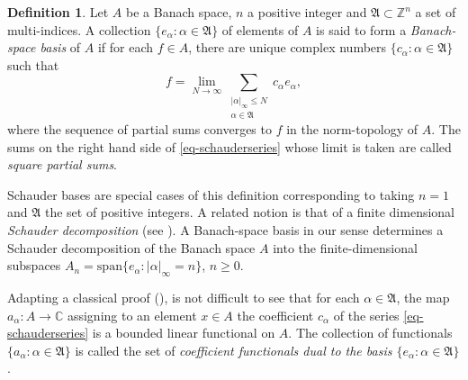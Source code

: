 \documentclass[letterpaper,11pt,reqno]{amsart}
\theoremstyle{plain}
\theoremstyle{definition}
\newtheorem{definition}[equation]{Definition}
\theoremstyle{remark}
\theoremstyle{remark}
\numberwithin{equation}{section}
\newcommand{\abs}[1]{\left\vert#1\right\vert}
\newcommand{\cx}{{\mathbb C}}
\newcommand{\Z}{{\mathbb Z}}
\begin{document}
\begin{definition}\label{def-schauderbasis}
Let $A$ be a Banach space, $n$ a positive integer and $\mathfrak{A} \subset \Z^n$ a set of multi-indices. 
A collection $\{e_\alpha: \alpha\in \mathfrak{A}\}$ of elements of $A$ is said to form a \emph{Banach-space basis} of $A$ if for each $f \in A$, there are unique complex numbers $\{c_\alpha: \alpha\in\mathfrak{A}\}$ such that
\begin{equation}\label{eq-schauderseries}  
f = \lim_{N\to \infty} \sum_{\substack{\abs{\alpha}_\infty\leq N\\\alpha\in \mathfrak{A}}} c_\alpha e_\alpha,  
\end{equation}
where the sequence of partial sums converges to $f$ in the norm-topology of $A$.
The sums on the right hand side of \eqref{eq-schauderseries} whose limit is taken are called  \emph{square partial sums}. 
\end{definition}

Schauder bases  are special cases of this definition corresponding to taking $n=1$ and
$\mathfrak{A}$ the set of positive integers. A related notion is that of a finite dimensional \emph{Schauder decomposition} (see \cite{lt}). A Banach-space basis in our sense determines a Schauder decomposition of the Banach space $A$
into the finite-dimensional subspaces $A_n = \mathrm{span}\{e_\alpha: \abs{\alpha}_\infty=n\}$, $n\geq 0$.

Adapting a classical proof (\cite[Proposition~1.a.2]{lt}), is not difficult to see that for each $\alpha\in \mathfrak{A}$, the map $a_\alpha:A\to \cx$ assigning to an element $x\in A$ the coefficient $c_\alpha$ of the series \eqref{eq-schauderseries} is a bounded linear functional on $A$.
The collection of functionals $\{a_\alpha:\alpha\in \mathfrak{A}\}$ is called the set of \emph{coefficient functionals dual to the basis $\{e_\alpha:\alpha\in \mathfrak{A}\}$}. 
\end{document}
